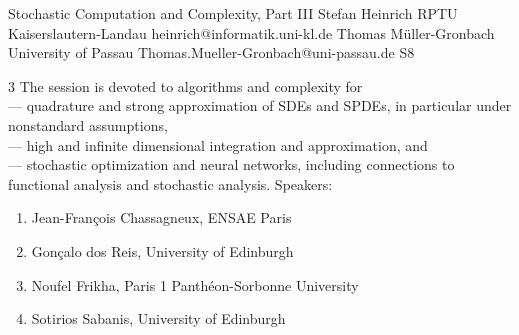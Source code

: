 

\clearpage

\begin{session}
 {Stochastic Computation and Complexity, Part III}%
 {Stefan Heinrich}%
 {RPTU Kaiserslautern-Landau}%
 {heinrich@informatik.uni-kl.de}%
 {Thomas M\"uller-Gronbach}%
 {University of Passau}%
 {Thomas.Mueller-Gronbach@uni-passau.de}%
 {S8}%
 {}%

 {3} %
 The session is devoted to algorithms and complexity for\\
 --- quadrature and strong approximation of SDEs and SPDEs, in particular under nonstandard assumptions,\\
 --- high and infinite dimensional integration and approximation, and\\
 --- stochastic optimization and neural networks,
 including connections to functional analysis and stochastic analysis.
 \medskip
 Speakers:
 \begin{enumerate}
 \item Jean-Fran\c{c}ois Chassagneux, ENSAE Paris
 \item Gon\c{c}alo dos Reis, University of Edinburgh
 \item Noufel Frikha, Paris 1 Panth\'eon-Sorbonne University
 \item Sotirios Sabanis, University of Edinburgh
 \end{enumerate}
\end{session}



\clearpage

